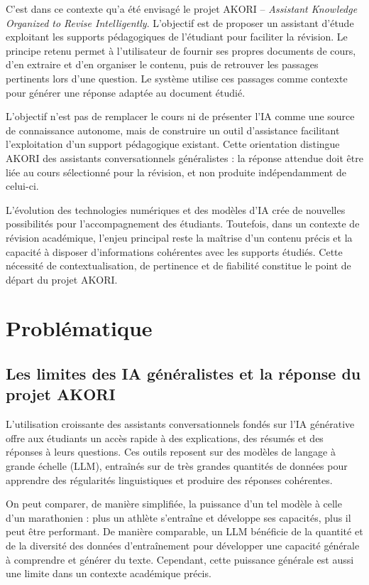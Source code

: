 \documentclass[12pt,a4paper,oneside]{report}
\begin{document}
C'est dans ce contexte qu'a été envisagé le projet AKORI -- \emph{Assistant Knowledge Organized to Revise Intelligently}. L'objectif est de proposer un assistant d'étude exploitant les supports pédagogiques de l'étudiant pour faciliter la révision. Le principe retenu permet à l'utilisateur de fournir ses propres documents de cours, d'en extraire et d'en organiser le contenu, puis de retrouver les passages pertinents lors d'une question. Le système utilise ces passages comme contexte pour générer une réponse adaptée au document étudié.

L'objectif n'est pas de remplacer le cours ni de présenter l'IA comme une source de connaissance autonome, mais de construire un outil d'assistance facilitant l'exploitation d'un support pédagogique existant. Cette orientation distingue AKORI des assistants conversationnels généralistes : la réponse attendue doit être liée au cours sélectionné pour la révision, et non produite indépendamment de celui-ci.

L'évolution des technologies numériques et des modèles d'IA crée de nouvelles possibilités pour l'accompagnement des étudiants. Toutefois, dans un contexte de révision académique, l'enjeu principal reste la maîtrise d'un contenu précis et la capacité à disposer d'informations cohérentes avec les supports étudiés. Cette nécessité de contextualisation, de pertinence et de fiabilité constitue le point de départ du projet AKORI.

\section{Problématique}

\subsection*{Les limites des IA généralistes et la réponse du projet AKORI}

L'utilisation croissante des assistants conversationnels fondés sur l'IA générative offre aux étudiants un accès rapide à des explications, des résumés et des réponses à leurs questions. Ces outils reposent sur des modèles de langage à grande échelle (LLM), entraînés sur de très grandes quantités de données pour apprendre des régularités linguistiques et produire des réponses cohérentes.

On peut comparer, de manière simplifiée, la puissance d'un tel modèle à celle d'un marathonien : plus un athlète s'entraîne et développe ses capacités, plus il peut être performant. De manière comparable, un LLM bénéficie de la quantité et de la diversité des données d'entraînement pour développer une capacité générale à comprendre et générer du texte. Cependant, cette puissance générale est aussi une limite dans un contexte académique précis.
\end{document}
